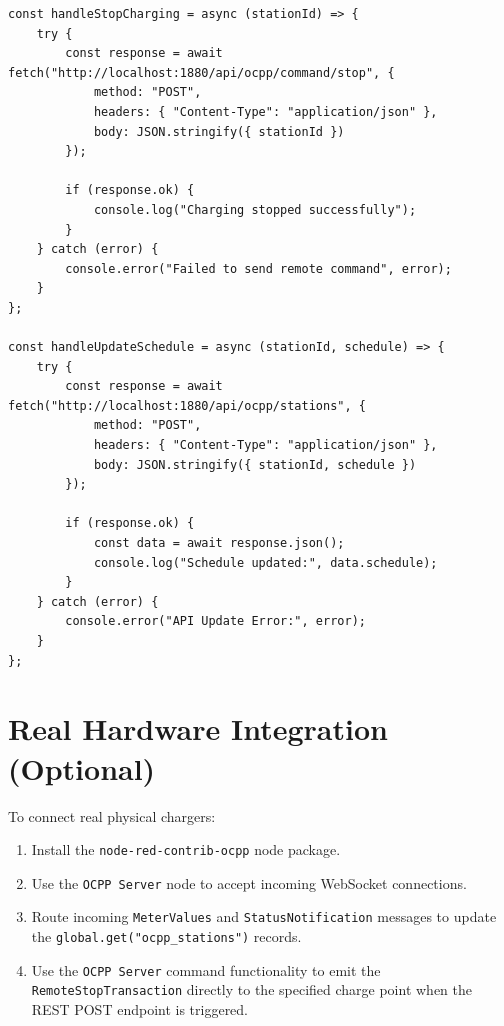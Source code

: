 \documentclass{article}
\begin{document}
\begin{lstlisting}[caption=Frontend Integration (React)]
const handleStopCharging = async (stationId) => {
    try {
        const response = await fetch("http://localhost:1880/api/ocpp/command/stop", {
            method: "POST",
            headers: { "Content-Type": "application/json" },
            body: JSON.stringify({ stationId })
        });
        
        if (response.ok) {
            console.log("Charging stopped successfully");
        }
    } catch (error) {
        console.error("Failed to send remote command", error);
    }
};

const handleUpdateSchedule = async (stationId, schedule) => {
    try {
        const response = await fetch("http://localhost:1880/api/ocpp/stations", {
            method: "POST",
            headers: { "Content-Type": "application/json" },
            body: JSON.stringify({ stationId, schedule })
        });
        
        if (response.ok) {
            const data = await response.json();
            console.log("Schedule updated:", data.schedule);
        }
    } catch (error) {
        console.error("API Update Error:", error);
    }
};
\end{lstlisting}

\section{Real Hardware Integration (Optional)}
To connect real physical chargers:
\begin{enumerate}
    \item Install the \texttt{node-red-contrib-ocpp} node package.
    \item Use the \texttt{OCPP Server} node to accept incoming WebSocket connections.
    \item Route incoming \texttt{MeterValues} and \texttt{StatusNotification} messages to update the \texttt{global.get("ocpp\_stations")} records.
    \item Use the \texttt{OCPP Server} command functionality to emit the \texttt{RemoteStopTransaction} directly to the specified charge point when the REST POST endpoint is triggered.
\end{enumerate}
\end{document}
